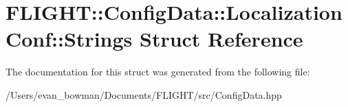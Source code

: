 \hypertarget{struct_f_l_i_g_h_t_1_1_config_data_1_1_localization_conf_1_1_strings}{}\section{F\+L\+I\+G\+HT\+:\+:Config\+Data\+:\+:Localization\+Conf\+:\+:Strings Struct Reference}
\label{struct_f_l_i_g_h_t_1_1_config_data_1_1_localization_conf_1_1_strings}


The documentation for this struct was generated from the following file\+:\begin{DoxyCompactItemize}
\item 
/\+Users/evan\+\_\+bowman/\+Documents/\+F\+L\+I\+G\+H\+T/src/Config\+Data.\+hpp\end{DoxyCompactItemize}
